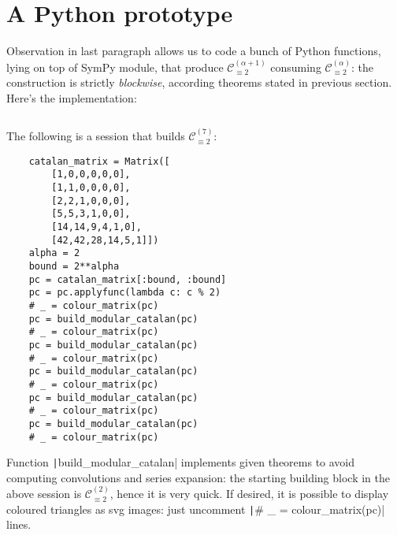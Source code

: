 
\appendix

\section{A Python prototype}

Observation in last paragraph allows us to code a bunch of Python functions, 
lying on top of SymPy module, that produce 
$\mathcal{C}_{\equiv 2}^{(\alpha+1)}$ consuming $\mathcal{C}_{\equiv 2}^{(\alpha)}$:
the construction is strictly \emph{blockwise}, according theorems stated
in previous section. Here's the implementation:

\begin{adjustwidth}{-4cm}{0cm}
    \inputminted{python}{../../PhD/projects/recurrences-unfolding/sympy-notebook/colouring.py}
\end{adjustwidth}

The following is a session that builds $\mathcal{C}_{\equiv 2}^{(7)}$:
\begin{verbatim}
    catalan_matrix = Matrix([
        [1,0,0,0,0,0], 
        [1,1,0,0,0,0], 
        [2,2,1,0,0,0], 
        [5,5,3,1,0,0], 
        [14,14,9,4,1,0], 
        [42,42,28,14,5,1]])
    alpha = 2
    bound = 2**alpha
    pc = catalan_matrix[:bound, :bound]
    pc = pc.applyfunc(lambda c: c % 2)
    # _ = colour_matrix(pc)
    pc = build_modular_catalan(pc)
    # _ = colour_matrix(pc)
    pc = build_modular_catalan(pc)
    # _ = colour_matrix(pc)
    pc = build_modular_catalan(pc)
    # _ = colour_matrix(pc)
    pc = build_modular_catalan(pc)
    # _ = colour_matrix(pc)
    pc = build_modular_catalan(pc)
    # _ = colour_matrix(pc)
\end{verbatim}

Function \texttt|build_modular_catalan| implements given theorems to avoid
computing convolutions and series expansion: the starting building block in the 
above session is $\mathcal{C}_{\equiv 2}^{(2)}$, hence it is very quick. 
If desired, it is possible to display coloured triangles as svg images:
just uncomment \texttt|# _ = colour_matrix(pc)| lines.

